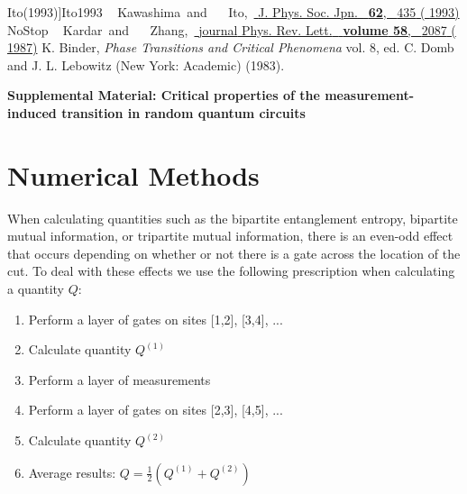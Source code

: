 \documentclass[prl,twocolumn,aps,showpacs,amsmath,amssymb,superscriptaddress,floatfix,longbibliography]{revtex4-1}
\begin{document}
\begin{thebibliography}{39}
{  {Ito}(1993)}]{Ito1993}\BibitemOpen
   { {~\bibnamefont
  {Kawashima}}\ and\  {~\bibnamefont
  {Ito}},\ }\href {\doibase 10.1143/JPSJ.62.435} {
  { {J. Phys. Soc. Jpn.}\ }\textbf {
  {62}},\  {435} ( {1993})}\BibitemShut
  {NoStop}\BibitemOpen
   { {~\bibnamefont
  {Kardar}}\ and\  {\ \bibnamefont
  {Zhang}},\ }\href {\doibase 10.1103/PhysRevLett.58.2087} {\bibfield
  {journal} { {Phys. Rev. Lett.}\ }\textbf {\bibinfo
  {volume} {58}},\  {2087} (
  {1987})}\BibitemOpen
  \href@noop {} {} {K. Binder, \textit{Phase Transitions and
  Critical Phenomena} vol. 8, ed. C. Domb and J. L. Lebowitz (New York:
  Academic) (1983).}\end{thebibliography} 

\pagebreak
\widetext
\begin{center}

\end{center}
\textbf{\large Supplemental Material: Critical properties of the measurement-induced transition in random quantum circuits}

\setcounter{equation}{0}
\setcounter{figure}{0}
\setcounter{table}{0}
\setcounter{page}{1}
\renewcommand{\theequation}{S\arabic{equation}}
\setcounter{figure}{0}
\renewcommand{\thefigure}{S\arabic{figure}}
\renewcommand{\thepage}{S\arabic{page}}
\renewcommand{\thesection}{S\arabic{section}}
\renewcommand{\thetable}{S\arabic{table}}
\makeatletter


\section{Numerical Methods}
When calculating quantities such as the bipartite entanglement entropy, bipartite mutual information, or tripartite mutual information, there is an even-odd effect that occurs depending on whether or not there is a gate across the location of the cut. To deal with these effects we use the following prescription when calculating a quantity $Q$:
\begin{enumerate}
\item Perform a layer of gates on sites [1,2], [3,4], ...
\item Calculate quantity $Q^{(1)}$
\item Perform a layer of measurements
\item Perform a layer of gates on sites [2,3], [4,5], ...
\item Calculate quantity $Q^{(2)}$
\item Average results: $Q = \frac{1}{2}\left(Q^{(1)} + Q^{(2)}\right)$
\end{enumerate}
\end{document}
